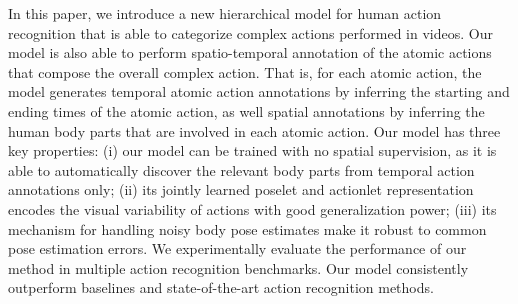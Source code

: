 In this paper, we introduce a new hierarchical model for human action
recognition that is able to categorize complex actions performed in videos.
Our model is also able to perform spatio-temporal annotation of the atomic
actions that compose the overall complex action. That is, for each atomic
action, the model generates temporal atomic action annotations by
inferring the starting and ending times of the atomic action, as well
spatial annotations by inferring the human body parts that are involved
in each atomic action. Our model has three key properties:
(i) our model can be trained with no spatial
supervision, as it is able to automatically discover the relevant body parts
from temporal action annotations only;
(ii) its jointly learned poselet and actionlet representation encodes the
visual variability of actions with good generalization power;
(iii) its mechanism for handling noisy body pose estimates make it robust to
common pose estimation errors.
We experimentally evaluate the performance of our method in multiple
action recognition benchmarks. Our model consistently outperform baselines
and state-of-the-art action recognition methods. 

